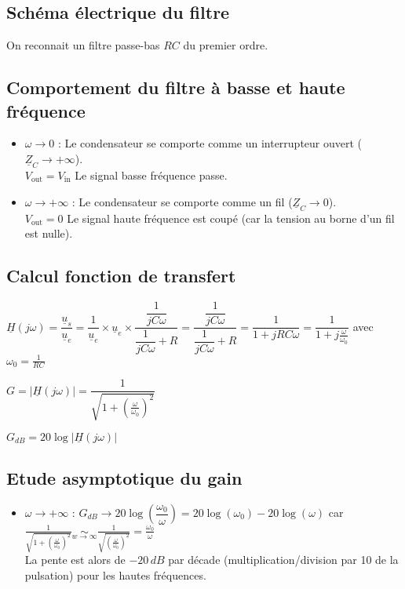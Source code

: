 \documentclass{article}
\begin{document}
\subsection{Schéma électrique du filtre}
On reconnait un filtre passe-bas $RC$ du premier ordre.


\subsection{Comportement du filtre à basse et haute fréquence}

\begin{itemize}[label=$\ast$]
    \item $\omega \rightarrow 0$ : Le condensateur se comporte comme un interrupteur ouvert ($\underline{Z}_C \rightarrow +\infty$).\\
        $V_{\text{out}}=V_{\text{in}}$ \quad Le signal basse fréquence passe.
    \item $\omega \rightarrow +\infty$ : Le condensateur se comporte comme un fil ($\underline{Z}_C \rightarrow 0$).\\
        $V_{\text{out}} = 0$ \quad Le signal haute fréquence est coupé (car la tension au borne d'un fil est nulle).
\end{itemize}

\subsection{Calcul fonction de transfert}

$\underline{H}(j\omega) = \dfrac{\underline{u}_s}{\underline{u}_e} =  \dfrac{1}{\underline{u}_e}\times\underline{u}_e \times \dfrac{\dfrac{1}{jC\omega}}{\dfrac{1}{jC\omega} + R} = \dfrac{\dfrac{1}{jC\omega}}{\dfrac{1}{jC\omega} + R} = \dfrac{1}{1+jRC\omega} = \dfrac{1}{1+j\frac{\omega}{\omega_0}}$
\quad avec $\omega_0=\frac{1}{RC}$

$G = \left|\underline{H}(j\omega)\right| = \dfrac{1}{\sqrt{1+\left(\frac{\omega}{\omega_0}\right)^2}}$

$G_{dB} = 20\log{\left|\underline{H}(j\omega)\right|} $

\subsection{Etude asymptotique du gain}

\begin{itemize}[label=$\ast$]
    \item $\omega \rightarrow +\infty$ : $G_{dB} \rightarrow 20\log{\left(\dfrac{\omega_0}{\omega}\right)} = 20\log{(\omega_0)} - 20\log{(\omega)}$ \quad
    car $\frac{1}{\sqrt{1+\left(\frac{\omega}{\omega_0}\right)^2}} \underset{w \to \infty}{\sim} \frac{1}{\sqrt{\left(\frac{\omega}{\omega_0}\right)^2}} = \frac{\omega_0}{\omega} $\\
    La pente est alors de $-20\,dB$ par décade (multiplication/division par 10 de la pulsation) pour les hautes fréquences.
\end{itemize}
\end{document}
